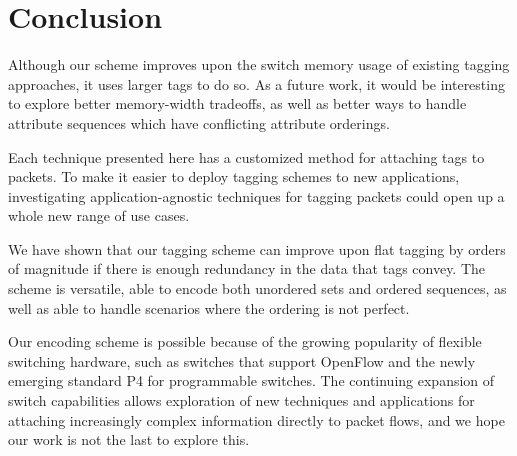 \section{Conclusion} \label{sec:conclusion}

Although our scheme improves upon the switch memory usage of existing tagging approaches, it uses larger tags to do so. As a future work, it would be interesting to explore better memory-width tradeoffs, as well as better ways to handle attribute sequences which have conflicting attribute orderings.

Each technique presented here has a customized method for attaching tags to packets. To make it easier to deploy tagging schemes to new applications, investigating application-agnostic techniques for tagging packets could open up a whole new range of use cases. 


We have shown that our tagging scheme can improve upon flat tagging by orders of magnitude if there is enough redundancy in the data that tags convey. The scheme is versatile, able to encode both unordered sets and ordered sequences, as well as able to handle scenarios where the ordering is not perfect. 

Our encoding scheme is possible because of the growing popularity of flexible switching hardware, such as switches that support OpenFlow and the newly emerging standard P4 for programmable switches. The continuing expansion of switch capabilities allows exploration of new techniques and applications for attaching increasingly complex information directly to packet flows, and we hope our work is not the last to explore this. 